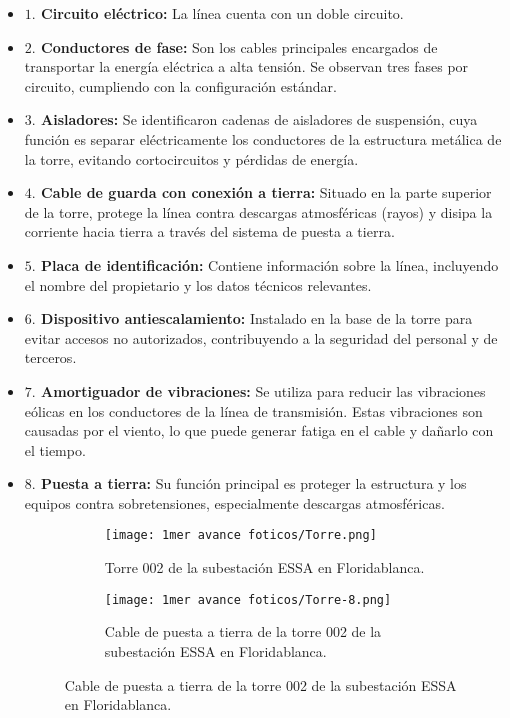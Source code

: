\begin{itemize}
    \item \textbf{$1.$ Circuito eléctrico:} La línea cuenta con un doble circuito.
    \item \textbf{$2.$ Conductores de fase:} Son los cables principales encargados de transportar la energía eléctrica a alta tensión. Se observan tres fases por circuito, cumpliendo con la configuración estándar.
    \item \textbf{$3.$ Aisladores:} Se identificaron cadenas de aisladores de suspensión, cuya función es separar eléctricamente los conductores de la estructura metálica de la torre, evitando cortocircuitos y pérdidas de energía.
    \item \textbf{$4.$ Cable de guarda con conexión a tierra:} Situado en la parte superior de la torre, protege la línea contra descargas atmosféricas (rayos) y disipa la corriente hacia tierra a través del sistema de puesta a tierra.
    \item \textbf{$5.$ Placa de identificación:} Contiene información sobre la línea, incluyendo el nombre del propietario y los datos técnicos relevantes.
    \item \textbf{$6.$ Dispositivo antiescalamiento:} Instalado en la base de la torre para evitar accesos no autorizados, contribuyendo a la seguridad del personal y de terceros.
    \item \textbf{$7.$ Amortiguador de vibraciones:} Se utiliza para reducir las vibraciones eólicas en los conductores de la línea de transmisión. Estas vibraciones son causadas por el viento, lo que puede generar fatiga en el cable y dañarlo con el tiempo.
    \item \textbf{$8.$ Puesta a tierra:} Su función principal es proteger la estructura y los equipos contra sobretensiones, especialmente descargas atmosféricas.


    
\begin{figure}[h!] %
    \centering %
    \begin{subfigure}{0.5\textwidth}
        \texttt{[image: 1mer avance foticos/Torre.png]}
        \caption{Torre 002 de la subestación ESSA en Floridablanca.} %
        \label{fig:Torre} %
    \end{subfigure}
    \hfill %
    \begin{subfigure}{0.5\textwidth}
        \centering %
        \texttt{[image: 1mer avance foticos/Torre-8.png]}
        \caption{Cable de puesta a tierra de la torre 002 de la subestación ESSA en Floridablanca.} %
        \label{fig:Torre-8} %
    \end{subfigure}
\end{figure}


\end{itemize}




